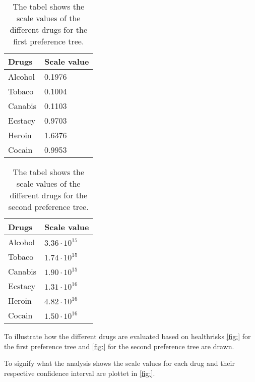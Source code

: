 % 
\begin{table}[H]
	\centering
	\begin{tabular}{@{}ll@{}}
		\toprule
		Drugs     & Scale value \\ \midrule
		Alcohol	  & 0.1976   \\
		Tobaco	  & 0.1004   \\
		Canabis	  & 0.1103   \\
		Ecstacy	  & 0.9703   \\
		Heroin	  & 1.6376   \\
		Cocain	  & 0.9953   \\	\bottomrule
	\end{tabular}
	\caption{The tabel shows the scale values of the different drugs for the first preference tree.}
	\label{tab:ScaleValues1}
\end{table} 
\noindent 
%

\begin{table}[H]
	\centering
	\begin{tabular}{@{}ll@{}}
		\toprule
		Drugs     & Scale value \\ \midrule
		Alcohol	  & $3.36\cdot10^{15}$   \\
		Tobaco	  & $1.74\cdot10^{15}$   \\
		Canabis	  & $1.90\cdot10^{15}$   \\
		Ecstacy	  & $1.31\cdot10^{16}$   \\
		Heroin	  & $4.82\cdot10^{16}$   \\
		Cocain	  & $1.50\cdot10^{16}$   \\	\bottomrule
	\end{tabular}
	\caption{The tabel shows the scale values of the different drugs for the second preference tree.}
	\label{tab:ScaleValues2}
\end{table} 
\noindent 
%
To illustrate how the different drugs are evaluated based on healthrisks \autoref{fig:} for the first preference tree and \autoref{fig:} for the second preference tree are drawn. 

To signify what the analysis shows the scale values for each drug and their respective confidence interval are plottet in \autoref{fig:}.

